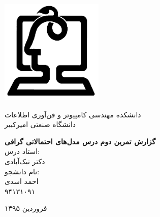 \documentclass[11.5pt,a4paper]{article}
\newcommand{\nocontentsline}[3]{}
\newcommand{\tocless}[2]{\bgroup\let\addcontentsline=\nocontentsline#1{#2}\egroup}
\begin{document}
\thispagestyle{empty}
\vspace*{-28mm}
\centerline{\includegraphics[height=5cm]{Imgs/ceit_logo.png}}

\begin{center}
\vspace{-2mm}
{\LARGE
{
دانشکده مهندسی کامپیوتر و فن‌آوری اطلاعات\\	
دانشگاه صنعتی امیرکبیر	
}
\\[2.1cm]
}

{\large
\textbf{گزارش تمرین دوم درس مدل‌های احتمالاتی گرافی}
\\[2cm]

استاد درس:
\\[.5cm]
{\Large
دکتر نیک‌آبادی}
\\[1.5cm]
\large 
نام دانشجو:
\\[.5cm]
{\Large
احمد اسدی}
\\[.5cm]
۹۴۱۳۱۰۹۱
\\[1.5cm]
}

{\large
فروردین ۱۳۹۵
}
\end{center}

\newpage
\baselineskip=1cm
\tocless\tableofcontents

\newpage
\baselineskip=0.75cm

\section{}

\vfill
\end{document}
